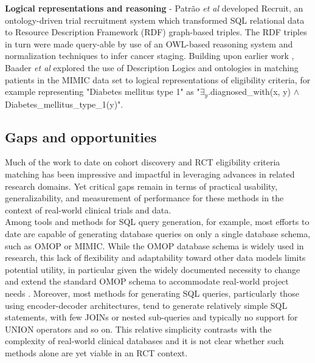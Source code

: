 \documentclass[../main.tex]{subfiles}
\begin{document}
\noindent \textbf{Logical representations and reasoning} - Patr{\~a}o \textit{et al} developed Recruit, an ontology-driven trial recruitment system which transformed SQL relational data to Resource Description Framework (RDF) graph-based triples. The RDF triples in turn were made query-able by use of an OWL-based reasoning system \cite{owl} and normalization techniques to infer cancer staging. Building upon earlier work \cite{patel2007matching, huang2013semanticct}, Baader \textit{et al} \cite{baader2018patient} explored the use of Description Logics and ontologies in matching patients in the MIMIC data set \cite{johnson2016mimic} to logical representations of eligibility criteria, for example representing "Diabetes mellitus type 1" as "$\exists_y$.diagnosed\_with(x, y) $\wedge$ Diabetes\_mellitus\_type\_1(y)".

\subsection*{Gaps and opportunities}

\noindent Much of the work to date on cohort discovery and RCT eligibility criteria matching has been impressive and impactful in leveraging advances in related research domains. Yet critical gaps remain in terms of practical usability, generalizability, and measurement of performance for these methods in the context of real-world clinical trials and data. \\

\noindent Among tools and methods for SQL query generation, for example, most efforts to date are capable of generating database queries on only a single database schema, such as OMOP or MIMIC. While the OMOP database schema is widely used in research, this lack of flexibility and adaptability toward other data models limits potential utility, in particular given the widely documented necessity to change and extend the standard OMOP schema to accommodate real-world project needs \cite{belenkaya2021extending, peng2021towards, zoch2021adaption, warner2019hemonc, zhou2013evaluation, shin2019genomic, kwon2019development}. Moreover, most methods for generating SQL queries, particularly those using encoder-decoder architectures, tend to generate relatively simple SQL statements, with few JOINs or nested sub-queries and typically no support for UNION operators and so on. This relative simplicity contrasts with the complexity of real-world clinical databases and it is not clear whether such methods alone are yet viable in an RCT context. \\
\end{document}
